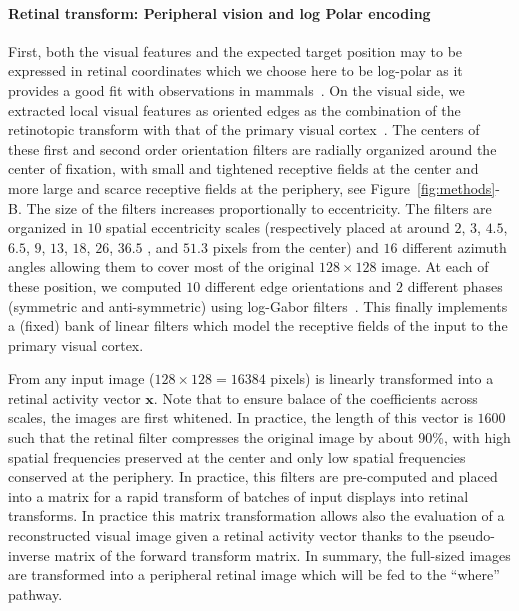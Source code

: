 \paragraph{Retinal transform: Peripheral vision and log Polar encoding}
First, both the visual features and the expected target position may to be expressed in retinal coordinates which we choose here to be log-polar as it provides a good fit with observations in mammals~\citep{Traver10}. On the visual side, we extracted local visual features as oriented edges  as the combination of the retinotopic transform with that of the primary visual cortex~\citep{Fischer2007a}. The centers of these first and second order orientation filters are radially organized around the center of fixation, with small and tightened receptive fields at the center and more large and scarce receptive fields at the periphery, see  Figure~\ref{fig:methods}-B. The size of the filters increases proportionally to eccentricity. The filters are organized in $10$ spatial eccentricity scales (respectively placed at around $2$, $3$, $4.5$, $6.5$, $9$, $13$, $18$, $26$, $36.5$ , and $51.3$ pixels from the center) and $16$ different azimuth angles allowing them to cover most of the original $128 \times 128 $ image. At each of these position, we computed $10$ different edge orientations and $2$ different phases (symmetric and anti-symmetric) using log-Gabor filters~\citep{Fischer2007a}. This finally implements a (fixed) bank of linear filters which model the receptive fields of the input to the primary visual cortex.

From any input image ($128\times 128=16384$ pixels) is linearly transformed into a retinal activity vector $\boldsymbol{x}$. Note that to ensure balace of the coefficients across scales, the images are first whitened. In practice, the length of this vector is $1600$ such that the retinal filter compresses the original image by about 90\%, with high spatial frequencies preserved at the center and only low spatial frequencies conserved at the periphery. In practice, this filters are pre-computed and placed into a matrix for a rapid transform of batches of input displays into retinal transforms. In practice this matrix transformation allows also the evaluation of a reconstructed visual image given a retinal activity vector thanks to the pseudo-inverse matrix of the forward transform matrix. In summary, the full-sized images are transformed into a peripheral retinal image which will be fed to the ``where'' pathway.

